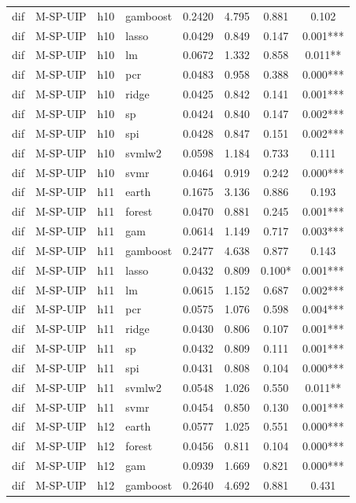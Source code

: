 \begin{ThreePartTable}
\begin{longtable}[t]{llclcccc}
dif & M-SP-UIP & h10 & gamboost & 0.2420 & 4.795 & 0.881 & 0.102\\
dif & M-SP-UIP & h10 & lasso & 0.0429 & 0.849 & 0.147 & 0.001***\\
dif & M-SP-UIP & h10 & lm & 0.0672 & 1.332 & 0.858 & 0.011**\\
dif & M-SP-UIP & h10 & pcr & 0.0483 & 0.958 & 0.388 & 0.000***\\
dif & M-SP-UIP & h10 & ridge & 0.0425 & 0.842 & 0.141 & 0.001***\\
dif & M-SP-UIP & h10 & sp & 0.0424 & 0.840 & 0.147 & 0.002***\\
dif & M-SP-UIP & h10 & spi & 0.0428 & 0.847 & 0.151 & 0.002***\\
dif & M-SP-UIP & h10 & svmlw2 & 0.0598 & 1.184 & 0.733 & 0.111\\
dif & M-SP-UIP & h10 & svmr & 0.0464 & 0.919 & 0.242 & 0.000***\\
\addlinespace
dif & M-SP-UIP & h11 & earth & 0.1675 & 3.136 & 0.886 & 0.193\\
dif & M-SP-UIP & h11 & forest & 0.0470 & 0.881 & 0.245 & 0.001***\\
dif & M-SP-UIP & h11 & gam & 0.0614 & 1.149 & 0.717 & 0.003***\\
dif & M-SP-UIP & h11 & gamboost & 0.2477 & 4.638 & 0.877 & 0.143\\
dif & M-SP-UIP & h11 & lasso & 0.0432 & 0.809 & 0.100* & 0.001***\\
dif & M-SP-UIP & h11 & lm & 0.0615 & 1.152 & 0.687 & 0.002***\\
dif & M-SP-UIP & h11 & pcr & 0.0575 & 1.076 & 0.598 & 0.004***\\
dif & M-SP-UIP & h11 & ridge & 0.0430 & 0.806 & 0.107 & 0.001***\\
dif & M-SP-UIP & h11 & sp & 0.0432 & 0.809 & 0.111 & 0.001***\\
dif & M-SP-UIP & h11 & spi & 0.0431 & 0.808 & 0.104 & 0.000***\\
dif & M-SP-UIP & h11 & svmlw2 & 0.0548 & 1.026 & 0.550 & 0.011**\\
dif & M-SP-UIP & h11 & svmr & 0.0454 & 0.850 & 0.130 & 0.001***\\
\addlinespace
dif & M-SP-UIP & h12 & earth & 0.0577 & 1.025 & 0.551 & 0.000***\\
dif & M-SP-UIP & h12 & forest & 0.0456 & 0.811 & 0.104 & 0.000***\\
dif & M-SP-UIP & h12 & gam & 0.0939 & 1.669 & 0.821 & 0.000***\\
dif & M-SP-UIP & h12 & gamboost & 0.2640 & 4.692 & 0.881 & 0.431\\

\end{longtable}
\end{ThreePartTable}

